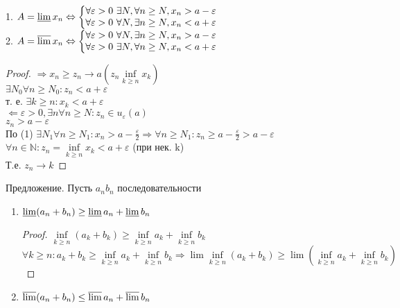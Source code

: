 \begin{theorem}
	1. $ A = \varliminf x_n  \Leftrightarrow \left\{ \begin{matrix}
	\forall \varepsilon > 0 \  \exists N, \forall n \geq N, x_n > a - \varepsilon \\
	\forall \varepsilon > 0 \  \forall N, \exists n \geq N , x_n  < a + \varepsilon 
	\end{matrix}  \right. $\\
	2. $ A = \varlimsup x_n  \Leftrightarrow \left\{ \begin{matrix}
	\forall \varepsilon > 0 \ \forall N, \exists n \geq N, x_n > a - \varepsilon \\
	\forall \varepsilon > 0 \  \exists N, \forall n \geq N , x_n  < a + \varepsilon 
	\end{matrix} \right.  $ \\
	\begin{proof}
		$ \Rightarrow x_n \geq z_n \rightarrow a (z_n  \inf\limits_{k \geq n} x_k) $\\
		$ \exists N_0 \forall n \geq N_0 : z_n < a + \varepsilon  $ \\
		т. е. $ \exists k \geq n : x_k < a + \varepsilon $ \\
		$ \Leftarrow \varepsilon > 0, \exists n \forall n \geq N : z_n \in u_{\varepsilon}(a) $\\
		$ z_n > a - \varepsilon $ \\
		По (1) $ \exists N_1 \forall n \geq N_1 : x_n > a - \frac{\varepsilon}{2} \Rightarrow \forall n \geq N_1 : z_n \geq a - \frac{\varepsilon }{2} > a - \varepsilon $ \\
		$ \forall n \in \mathbb{N} : z_n = \inf\limits_{k \geq n} x_k < a + \varepsilon $ (при нек. k) \\
		Т.е. $ z_n \rightarrow k $
	\end{proof}
\end{theorem} 
Предложение. Пусть $ a_n b_n $ последовательности
\begin{enumerate}
	\item $ \varliminf(a_n + b_n) \geq \varliminf a_n + \varliminf b_n $ 
	\begin{proof}
		$ \inf\limits_{k \geq n} (a_k + b_k) \geq  \inf\limits_{k \geq n} a_k +  \inf\limits_{k \geq n} b_k $ \\
		$ \forall k \geq n : a_k + b_k \geq  \inf\limits_{k \geq n} a_k +  \inf\limits_{k \geq n} b_k \Rightarrow \lim\inf\limits_{k \geq n} (a_k + b_k ) \geq \lim( \inf\limits_{k \geq n} a_k +  \inf\limits_{k \geq n} b_k) $\\
	\end{proof}
	\item $ \varlimsup(a_n+b_n) \leq \varlimsup a_n + \varlimsup b_n $ 
\end{enumerate}

